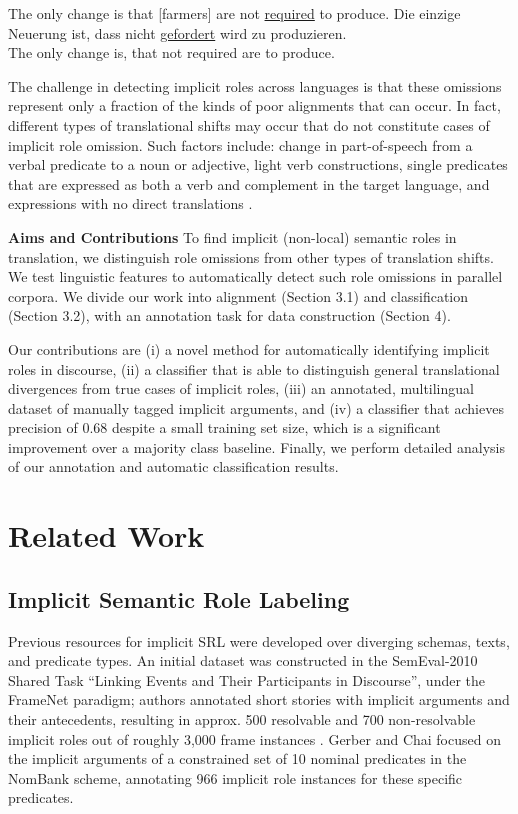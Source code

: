 \documentclass[11pt]{article}
\begin{document}
\begin{exe}
\ex The only change is that [farmers] are not \underline{required} to produce.
 \vspace*{-2mm}
\gll Die einzige Neuerung ist, dass nicht \underline{gefordert} wird zu produzieren.\\
The only change is, that not required are to produce.\\
\end{exe}


The challenge in detecting implicit roles across languages is that these omissions represent only a fraction of the kinds of poor alignments that can occur. In fact, different types of translational shifts may occur that do not constitute cases of implicit role omission.
Such factors include: change in part-of-speech from a verbal predicate to a noun or adjective, light verb constructions, single predicates that are expressed as both a verb and complement in the target language, and expressions with no direct translations \cite{samardvzicscope}.


{\bf \flushleft Aims and Contributions}
To find implicit (non-local) semantic roles in translation, we distinguish role omissions from other types of translation shifts. We test linguistic features to automatically detect such role omissions in parallel corpora. 
We divide our work into alignment (Section 3.1) and classification (Section 3.2), with an annotation task for data construction (Section 4). 

Our contributions are (i) a novel method for automatically identifying implicit roles in discourse, (ii) a classifier that is able to distinguish general translational divergences from true cases of implicit roles, (iii) an annotated, multilingual dataset of manually tagged implicit arguments, and (iv) a classifier that achieves precision of 0.68 despite a small training set size, which is a significant improvement over a majority class baseline. Finally, we perform detailed analysis of our annotation and automatic classification results. 

\section{Related Work}
\subsection{Implicit Semantic Role Labeling}
Previous resources for implicit SRL were developed over diverging schemas, texts, and predicate types. An initial dataset was constructed in the SemEval-2010 Shared Task ``Linking Events and Their Participants in Discourse'', under the FrameNet paradigm; authors annotated short stories with implicit arguments and their antecedents, resulting in approx. 500 resolvable and 700 non-resolvable implicit roles out of roughly 3,000 frame instances \cite{ruppenhofer2010semeval}. Gerber and Chai  focused on the implicit arguments of a constrained set of 10 nominal predicates in the NomBank scheme, annotating 966 implicit role instances for these specific predicates.
\end{document}
